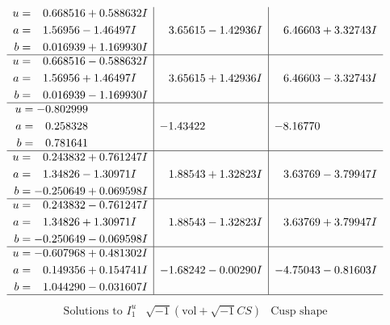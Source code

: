 \documentclass[1p]{elsarticle_modified}
\theoremstyle{definition}
\newcommand{\I}{\sqrt{-1}}
\begin{document}
$$\begin{array}{c|c|c}
\begin{aligned}
u &= \phantom{-}0.668516 + 0.588632 I \\
a &= \phantom{-}1.56956 - 1.46497 I \\
b &= \phantom{-}0.016939 + 1.169930 I\end{aligned}
 & \phantom{-}3.65615 - 1.42936 I & \phantom{-}6.46603 + 3.32743 I \\ \hline\begin{aligned}
u &= \phantom{-}0.668516 - 0.588632 I \\
a &= \phantom{-}1.56956 + 1.46497 I \\
b &= \phantom{-}0.016939 - 1.169930 I\end{aligned}
 & \phantom{-}3.65615 + 1.42936 I & \phantom{-}6.46603 - 3.32743 I \\ \hline\begin{aligned}
u &= -0.802999\phantom{ +0.000000I} \\
a &= \phantom{-}0.258328\phantom{ +0.000000I} \\
b &= \phantom{-}0.781641\phantom{ +0.000000I}\end{aligned}
 & -1.43422\phantom{ +0.000000I} & -8.16770\phantom{ +0.000000I} \\ \hline\begin{aligned}
u &= \phantom{-}0.243832 + 0.761247 I \\
a &= \phantom{-}1.34826 - 1.30971 I \\
b &= -0.250649 + 0.069598 I\end{aligned}
 & \phantom{-}1.88543 + 1.32823 I & \phantom{-}3.63769 - 3.79947 I \\ \hline\begin{aligned}
u &= \phantom{-}0.243832 - 0.761247 I \\
a &= \phantom{-}1.34826 + 1.30971 I \\
b &= -0.250649 - 0.069598 I\end{aligned}
 & \phantom{-}1.88543 - 1.32823 I & \phantom{-}3.63769 + 3.79947 I \\ \hline\begin{aligned}
u &= -0.607968 + 0.481302 I \\
a &= \phantom{-}0.149356 + 0.154741 I \\
b &= \phantom{-}1.044290 - 0.031607 I\end{aligned}
 & -1.68242 - 0.00290 I & -4.75043 - 0.81603 I\\
 \hline 
 \end{array}$$\newpage$$\begin{array}{c|c|c}  
\text{Solutions to }I^u_{1}& \I (\text{vol} + \sqrt{-1}CS) & \text{Cusp shape}\\

\end{array}$$
\end{document}
